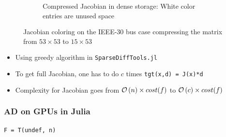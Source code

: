 \begin{frame}
\begin{center}
\begin{figure}
\begin{subfigure}[b]{0.35\linewidth}
         \caption{Compressed Jacobian in dense storage: White color entries are unused space}
     \end{subfigure}
    \caption{Jacobian coloring on the IEEE-30 bus case compressing the matrix from $53 \times 53$ to $15 \times 53$}
    \label{fig:coloring}
\end{figure}
\end{center}
  \begin{itemize}
    \item Using greedy algorithm in \lstinline{SparseDiffTools.jl}
    \item To get full Jacobian, one has to do $c$ times \lstinline{tgt(x,d) = J(x)*d}
    \item Complexity for Jacobian goes from $\mathcal{O}\left( n \right) \times cost(f)$ to $\mathcal{O}\left( c \right) \times cost(f)$
  \end{itemize}
\end{frame}

\begin{frame}
  \frametitle{AD on GPUs in Julia}
  \begin{center}
    \lstinline{F = T(undef, n)}
  \end{center}
\end{frame}

